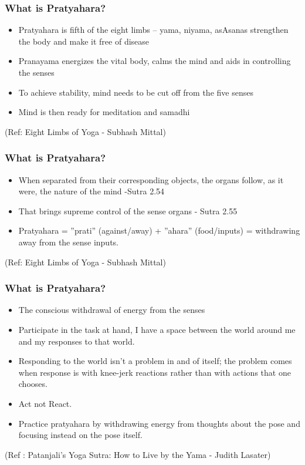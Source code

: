 \begin{frame}[fragile]\frametitle{What is Pratyahara?}


	\begin{itemize}
	\item Pratyahara is fifth of the eight limbs – yama, 
niyama, asAsanas strengthen the body and make it free 
of disease
	\item Pranayama energizes the vital body, calms the 
mind and aids in controlling the senses
	\item To achieve stability, mind needs to be cut off 
from the five senses
	\item  Mind is then ready for meditation and 
samadhi
	\end{itemize}

\tiny{(Ref: Eight Limbs of Yoga - Subhash Mittal)}

\end{frame}

\begin{frame}[fragile]\frametitle{What is Pratyahara?}


	\begin{itemize}
	\item  When separated from their corresponding 
objects, the organs follow, as it were, the nature 
of the mind -Sutra 2.54
	\item   That brings supreme control of the sense organs -
Sutra 2.55
	\item   Pratyahara = ''prati'' (against/away) + ''ahara'' 
(food/inputs)  = withdrawing away from the 
sense inputs.
	\end{itemize}

\tiny{(Ref: Eight Limbs of Yoga - Subhash Mittal)}

\end{frame}

\begin{frame}[fragile]\frametitle{What is Pratyahara?}


	\begin{itemize}
	\item The conscious withdrawal of energy from the senses
	\item Participate in the task at hand, I have a space between the world around me and my responses to that world.
	\item Responding to the world isn't a problem in and of itself; the problem comes when response is with knee-jerk reactions rather than with actions that one chooses.
	\item Act not React.
	\item Practice pratyahara by withdrawing energy from thoughts about the pose and focusing instead on the pose itself.
	\end{itemize}

{\tiny (Ref : Patanjali's Yoga Sutra: How to Live by the Yama - Judith Lasater)}
\end{frame}



